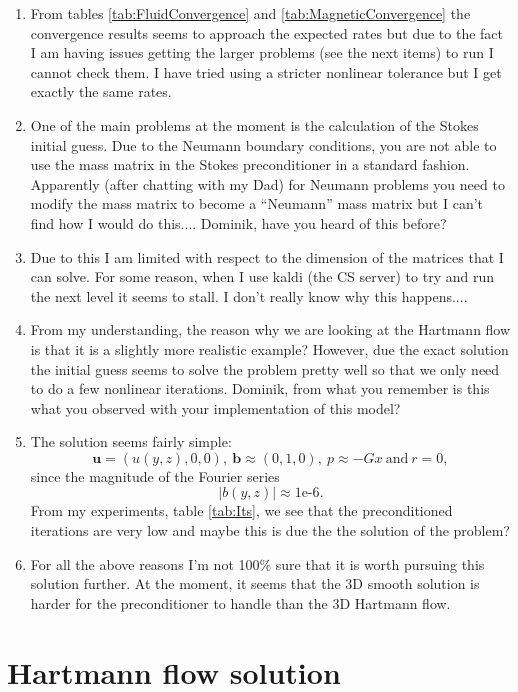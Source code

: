 \documentclass{article}
\newcommand{\uu}[1]{\boldsymbol #1}
\begin{document}
\begin{enumerate}
    \item From tables \ref{tab:FluidConvergence} and \ref{tab:MagneticConvergence} the convergence results seems to approach the expected rates but due to the fact I am having issues getting the larger problems (see the next items) to run I cannot check them. I have tried using a stricter nonlinear tolerance but I get exactly the same rates.
    \item One of the main problems at the moment is the calculation of the Stokes initial guess. Due to the Neumann boundary conditions, you are not able to use the mass matrix in the Stokes preconditioner in a standard fashion. Apparently (after chatting with my Dad) for Neumann problems you need to modify the mass matrix to become a ``Neumann'' mass matrix but I can't find how I would do this.... Dominik, have you heard of this before?
    \item Due to this I am limited with respect to the dimension of the matrices that I can solve. For some reason, when I use kaldi (the CS server) to try and run the next level it seems to stall. I don't really know why this happens....
    \item From my understanding, the reason why we are looking at the Hartmann flow is that it is a slightly more realistic example? However, due the exact solution the initial guess seems to solve the problem pretty well so that we only need to do a few nonlinear iterations. Dominik, from what you remember is this what you observed with your implementation of this model?
    \item The solution seems fairly simple:
    $$ \uu{u} = (u(y,z),0,0), \ \uu{b} \approx (0,1,0), \ p\approx -Gx \ \mbox{and} \ r = 0,$$
    since the magnitude of the Fourier series $$|b(y,z)| \approx \mbox{1e-6}.$$ From my experiments, table \ref{tab:Its}, we see that the preconditioned iterations are very low and maybe this is due the the solution of the problem?
    \item For all the above reasons I'm not 100\% sure that it is worth pursuing this solution further. At the moment, it seems that the 3D smooth solution is harder for the preconditioner to handle than the 3D Hartmann flow.
\end{enumerate}

\newpage

\section{Hartmann flow solution}
\end{document}
